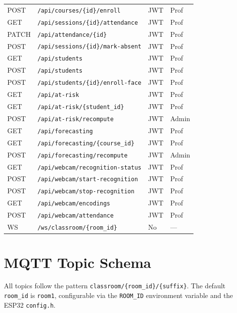 \begin{table}[H]
\begin{tabular}{@{}p{0.8cm}p{3.6cm}p{1.2cm}p{2.0cm}@{}}
POST & \texttt{/api/courses/\{id\}/enroll}    & JWT & Prof \\
GET  & \texttt{/api/sessions/\{id\}/attendance} & JWT & Prof \\
PATCH& \texttt{/api/attendance/\{id\}}        & JWT & Prof \\
POST & \texttt{/api/sessions/\{id\}/mark-absent} & JWT & Prof \\
GET  & \texttt{/api/students}                 & JWT & Prof \\
POST & \texttt{/api/students}                 & JWT & Prof \\
POST & \texttt{/api/students/\{id\}/enroll-face} & JWT & Prof \\
GET  & \texttt{/api/at-risk}                  & JWT & Prof \\
GET  & \texttt{/api/at-risk/\{student\_id\}}  & JWT & Prof \\
POST & \texttt{/api/at-risk/recompute}        & JWT & Admin \\
GET  & \texttt{/api/forecasting}              & JWT & Prof \\
GET  & \texttt{/api/forecasting/\{course\_id\}} & JWT & Prof \\
POST & \texttt{/api/forecasting/recompute}    & JWT & Admin \\
GET  & \texttt{/api/webcam/recognition-status} & JWT & Prof \\
POST & \texttt{/api/webcam/start-recognition} & JWT & Prof \\
POST & \texttt{/api/webcam/stop-recognition}  & JWT & Prof \\
GET  & \texttt{/api/webcam/encodings}         & JWT & Prof \\
POST & \texttt{/api/webcam/attendance}        & JWT & Prof \\
WS   & \texttt{/ws/classroom/\{room\_id\}}    & No  & — \\
\bottomrule
\end{tabular}
\end{table}

\section{MQTT Topic Schema}
\label{app:mqtt}

All topics follow the pattern \texttt{classroom/\{room\_id\}/\{suffix\}}.
The default \texttt{room\_id} is \texttt{room1}, configurable via the
\texttt{ROOM\_ID} environment variable and the ESP32 \texttt{config.h}.

